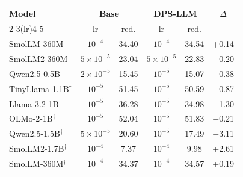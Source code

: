 \begin{tabular}{@{}lccccc@{}}
\toprule
\textbf{Model} & \multicolumn{2}{c}{\textbf{Base}} & \multicolumn{2}{c}{\textbf{DPS-LLM}} & $\Delta$ \\
\cmidrule(lr){2-3}\cmidrule(lr){4-5}
 & lr & red. & lr & red. & \\
\midrule
SmolLM-360M & $10^{-4}$ & 34.40 & $10^{-4}$ & 34.54 & +0.14 \\
SmolLM2-360M & $5{\times}10^{-5}$ & 23.04 & $5{\times}10^{-5}$ & 22.83 & $-$0.20 \\
Qwen2.5-0.5B & $2{\times}10^{-5}$ & 15.45 & $10^{-5}$ & 15.07 & $-$0.38 \\
TinyLlama-1.1B$^\dagger$ & $10^{-5}$ & 51.45 & $10^{-5}$ & 50.59 & $-$0.87 \\
Llama-3.2-1B$^\dagger$ & $10^{-5}$ & 36.28 & $10^{-5}$ & 34.98 & $-$1.30 \\
OLMo-2-1B$^\dagger$ & $10^{-5}$ & 52.04 & $10^{-5}$ & 51.83 & $-$0.21 \\
Qwen2.5-1.5B$^\dagger$ & $5{\times}10^{-5}$ & 20.60 & $10^{-5}$ & 17.49 & $-$3.11 \\
SmolLM2-1.7B$^\dagger$ & $10^{-4}$ & 7.37 & $10^{-4}$ & 9.98 & +2.61 \\
SmolLM-360M$^\dagger$ & $10^{-4}$ & 34.37 & $10^{-4}$ & 34.57 & +0.19 \\
\bottomrule
\end{tabular}
